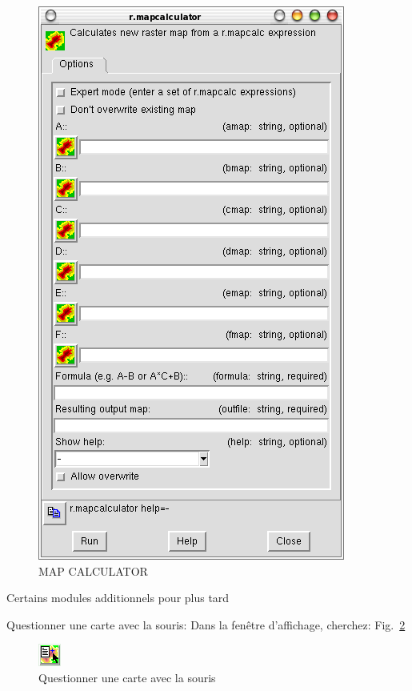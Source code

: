 \begin{figure}[htbp]
   \centering
   \includegraphics[scale=0.35]{grass016.png}
   \caption{MAP CALCULATOR}
   \label{fig:grass016}
\end{figure}

Certains modules additionnels pour plus tard

Questionner une carte avec la souris:   
Dans la fen\^etre d'affichage, cherchez:   Fig.~\ref{fig:grass017}

\begin{figure}[htbp]
   \centering
   \includegraphics[scale=1]{grass017.png}
   \caption{Questionner une carte avec la souris}
   \label{fig:grass017}
\end{figure}

